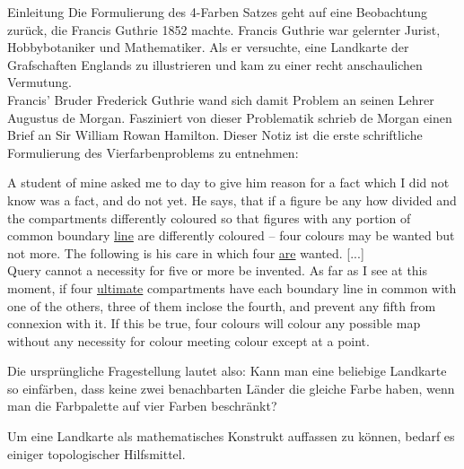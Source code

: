 \begin{chapter}{Einleitung}
 Die Formulierung des 4-Farben Satzes geht auf eine Beobachtung zurück, die Francis Guthrie 1852 machte. Francis Guthrie war gelernter Jurist, Hobbybotaniker und Mathematiker. Als er versuchte, eine Landkarte der Grafschaften Englands zu illustrieren und kam zu einer recht anschaulichen Vermutung. \\
 Francis' Bruder Frederick Guthrie wand sich damit Problem an seinen Lehrer Augustus de Morgan. Fasziniert von dieser Problematik schrieb de Morgan einen Brief an Sir William Rowan Hamilton. Dieser Notiz ist die erste schriftliche Formulierung des Vierfarbenproblems zu entnehmen:
 
 \begin{satz}
  A student of mine asked me to day to give him reason for a fact which I did not know was a fact, and do not yet. He says, that if a figure be any how divided and the compartments differently coloured so that figures with any portion of common boundary \underline{line} are differently coloured -- four colours may be wanted but not more. The following is his care in which four \underline{are} wanted. [...]\\
  Query cannot a necessity for five or more be invented. As far as I see at this moment, if four \underline{ultimate} compartments have each boundary line in common with one of the others, three of them inclose the fourth, and prevent any fifth from connexion with it. If this be true, four colours will colour any possible map without any necessity for colour meeting colour except at a point.  \cite{fritsch}
 \end{satz}
 
 Die ursprüngliche Fragestellung lautet also: Kann man eine beliebige Landkarte so einfärben, dass keine zwei benachbarten Länder die gleiche Farbe haben, wenn man die Farbpalette auf vier Farben beschränkt?
 
 Um eine Landkarte als mathematisches Konstrukt auffassen zu können, bedarf es einiger topologischer Hilfsmittel. 

\end{chapter}